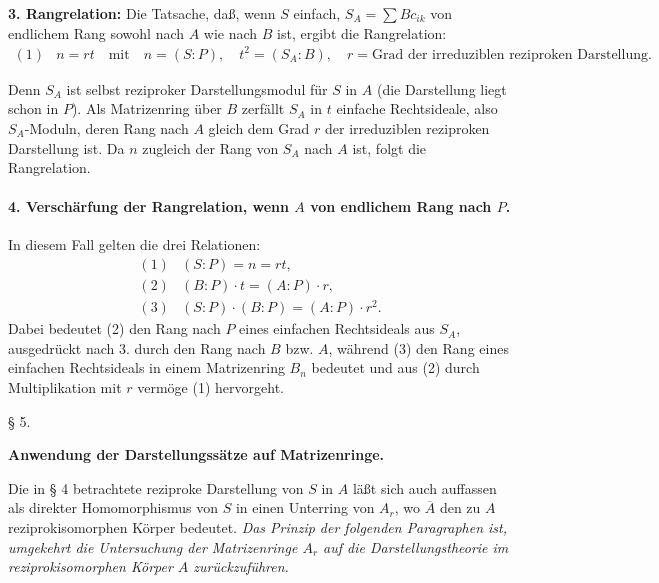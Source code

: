 \noindent\textbf{3. Rangrelation:} Die Tatsache, daß, wenn \(S\) einfach, \(S_A=\sum Bc_{ik}\) von endlichem Rang sowohl nach \(A\) wie nach \(B\) ist, ergibt die Rangrelation:
\[
\begin{array}{rl}
(1)& n=rt\quad\text{mit}\quad n=(S:P),\quad t^2=(S_A:B),\quad r=\text{Grad der irreduziblen reziproken Darstellung}.
\end{array}
\]

Denn \(S_A\) ist selbst reziproker Darstellungsmodul für \(S\) in \(A\) (die Darstellung liegt schon in \(P\)). Als Matrizenring über \(B\) zerfällt \(S_A\) in \(t\) einfache Rechtsideale, also \(S_A\)-Moduln, deren Rang nach \(A\) gleich dem Grad \(r\) der irreduziblen reziproken Darstellung ist. Da \(n\) zugleich der Rang von \(S_A\) nach \(A\) ist, folgt die Rangrelation.

\paragraph{4. Verschärfung der Rangrelation, wenn \(A\) von endlichem Rang nach \(P\).}
In diesem Fall gelten die drei Relationen:
\[
\begin{array}{rl}
(1)& (S:P)=n=rt,\\
(2)& (B:P)\cdot t=(A:P)\cdot r,\\
(3)& (S:P)\cdot(B:P)=(A:P)\cdot r^2.
\end{array}
\]
Dabei bedeutet (2) den Rang nach \(P\) eines einfachen Rechtsideals aus \(S_A\), ausgedrückt nach 3. durch den Rang nach \(B\) bzw. \(A\), während (3) den Rang eines einfachen Rechtsideals in einem Matrizenring \(B_n\) bedeutet und aus (2) durch Multiplikation mit \(r\) vermöge (1) hervorgeht.

\begin{center}
§ 5.

\textbf{Anwendung der Darstellungssätze auf Matrizenringe.}
\end{center}

Die in § 4 betrachtete reziproke Darstellung von \(S\) in \(A\) läßt sich auch auffassen als direkter Homomorphismus von \(S\) in einen Unterring von \(A_r\), wo \(\overline A\) den zu \(A\) reziprokisomorphen Körper bedeutet. \emph{Das Prinzip der folgenden Paragraphen ist, umgekehrt die Untersuchung der Matrizenringe \(A_r\) auf die Darstellungstheorie im reziprokisomorphen Körper \(A\) zurückzuführen.}

